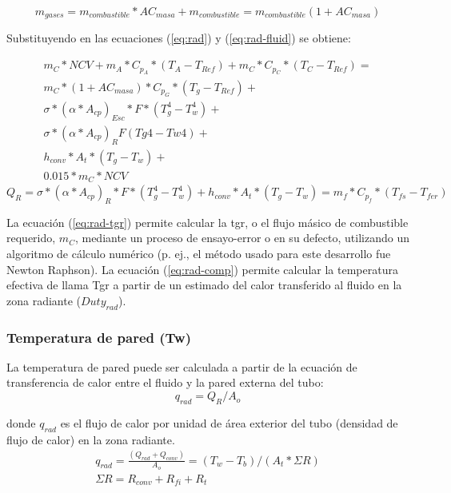 \begin{equation}
    m_{gases} = m_{combustible} * AC_{masa} + m_{combustible} = 
    m_{combustible} (1 + AC_{masa})
\end{equation}

Substituyendo  en las ecuaciones (\ref{eq:rad}) y (\ref{eq:rad-fluid}) se obtiene:

\begin{equation}\label{eq:rad-tgr}
\begin{gathered}
    m_C*NCV +m_A*C_{p_A}*(T_A -T_{Ref}) + m_C*C_{p_C}*(T_C -T_{Ref}) = \\
    m_C*(1 +AC_{masa})*C_{p_G}*(T_g -T_{Ref}) + \\
    \sigma *(\alpha *A_{cp})_{Esc}*F*(T_g^4-T_w^4) + \\
    \sigma *(\alpha *A_{cp})_R F (Tg4 - Tw4) + \\
    h_{conv}*A_t*(T_g -T_w) + \\
    0.015*m_C*NCV
\end{gathered}
\end{equation}
\begin{equation}
\label{eq:rad-comp}
Q_R = 
\sigma * (\alpha * A_{cp})_R *F *(T_g^4 -T_w^4) +h_{conv} *A_t *(T_g -T_w)
= m_f * C_{p_f} * (T_{fs} - T_{fer})
\end{equation}
\par La ecuación (\ref{eq:rad-tgr}) permite calcular la \ac{tgr}, o el flujo másico de combustible requerido, $m_C$, mediante un proceso de ensayo-error o en su defecto, utilizando un algoritmo de cálculo numérico (p. ej., el método usado para este desarrollo fue Newton Raphson). La ecuación (\ref{eq:rad-comp}) permite calcular la  temperatura efectiva de llama Tgr a partir de un estimado del calor transferido al fluido en la zona radiante ($Duty_{rad}$).

\subsubsection{Temperatura de pared (Tw)}
\par La temperatura de pared puede ser calculada a partir de la ecuación de transferencia de calor entre el fluido y la pared externa del tubo:
\begin{equation*}
    q_{rad} = Q_R / A_o
\end{equation*}

donde $q_{rad}$ es el flujo de calor por unidad de área exterior del tubo (densidad de flujo de calor) en la zona radiante.
\begin{gather*}
q_{rad} = \frac{(Q_{rad} + Q_{conv})}{A_o} = (T_w - T_b) / (A_t *\Sigma R) \\
\Sigma R = R_{conv} + R_{fi} + R_t
\end{gather*}

